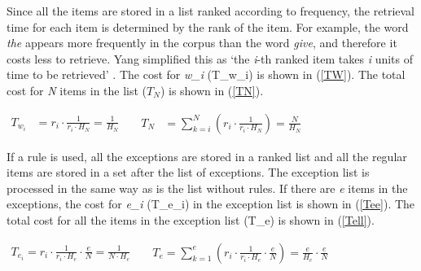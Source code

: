 Since all the items are stored in a list ranked according to frequency, the retrieval time for each item is determined by the rank of the item. For example, the word \textit{the} appears more frequently in the corpus than the word \textit{give}, and therefore it costs less to retrieve. Yang simplified this as `the \textit{i}-th ranked item takes \textit{i} units of time to be retrieved' \citep{yang2018user}. The cost for \textit{w_i} (T_{w_i}) is shown in (\ref{TW}). The total cost for \textit{N} items in the list ($T_N$) is shown in (\ref{TN}).
\begin{exe}
\ex \label{TW}
$\begin{aligned}
T_{w_i} & = r_i\cdot\frac{1}{r_i\cdot H_N} = \frac{1}{H_N}&
\end{aligned}$
\ex \label{TN}
$\begin{aligned}
T_N & = \displaystyle\sum_{k=i}^N (r_i\cdot\frac{1}{r_i\cdot H_N}) = \frac{N}{H_N}&
\end{aligned}$
\end{exe}

If a rule is used, all the exceptions are stored in a ranked list and all the regular items are stored in a set after the list of exceptions. The exception list is processed in the same way as is the list without rules. If there are \textit{e} items in the exceptions, the cost for \textit{e_i} (T_{e_i}) in the exception list is shown in (\ref{Tee}). The total cost for all the items in the exception list (T_e) is shown in (\ref{Tell}). 

\begin{exe}
\ex \label{Tee}
$\begin{aligned}
T_{e_i} = r_i\cdot\frac{1}{r_i\cdot H_e}\cdot\frac{e}{N} = \frac{1}{N\cdot H_e}&
\end{aligned}$
\ex \label{Tell}
$\begin{aligned}
T_{e} = \displaystyle\sum_{k=1}^e(r_i\cdot\frac{1}{r_i\cdot H_e}\cdot\frac{e}{N}) = \frac{e}{H_e}\cdot\frac{e}{N}&
\end{aligned}$
\end{exe}

